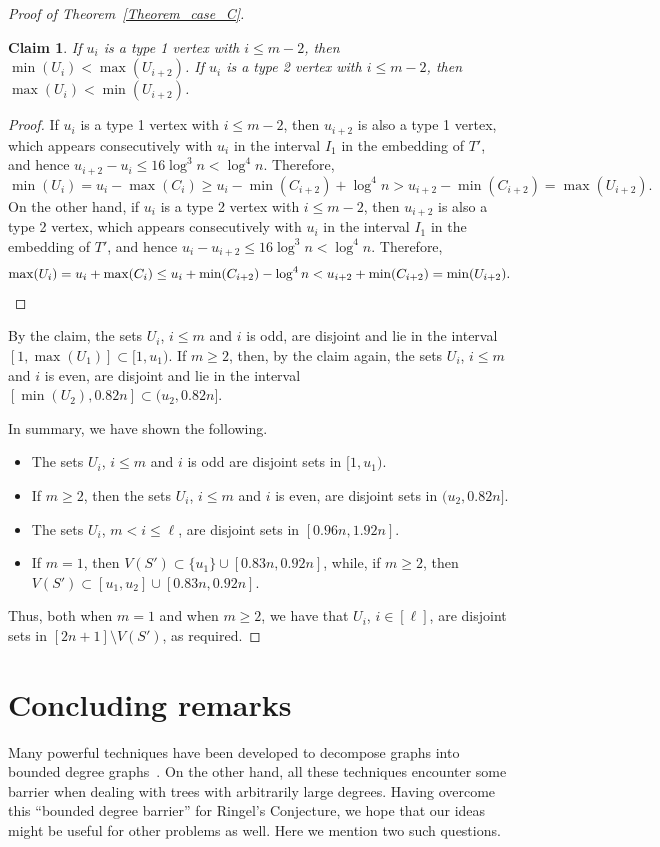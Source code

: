 \documentclass{article}
\newtheorem{claim}[lemma]{Claim}
\theoremstyle{definition}
\begin{document}
\begin{proof}[Proof of Theorem~\ref{Theorem_case_C}]
\begin{claim}
If $u_{i}$ is a type 1 vertex with $i\leq m-2$, then $\min(U_i)< \max (U_{i+2})$.
If $u_{i}$ is a type 2 vertex with $i\leq m-2$, then $\max(U_i) < \min (U_{i+2})$.
\end{claim}
\begin{proof}
If $u_i$ is a type 1 vertex with $i\leq m-2$, then $u_{i+2}$ is also a type 1 vertex, which appears consecutively with $u_i$ in the interval $I_1$ in the embedding of $T'$, and hence $u_{i+2}-u_i\leq 16 \log^3 n<\log^4 n$. Therefore,
\[
\min(U_i)=u_{i}-\max (C_i)\geq u_i-\min(C_{i+2})+\log^4 n > u_{i+2}-\min(C_{i+2})=\max(U_{i+2}).
\]
On the other hand, if $u_i$ is a type 2 vertex with $i\leq m-2$, then $u_{i+2}$ is also a type 2 vertex, which appears consecutively with $u_i$ in the interval $I_1$ in the embedding of $T'$, and hence $u_{i}-u_{i+2}\leq 16 \log^3 n <\log^4 n$. Therefore,
\[
\max(U_i)=u_{i}+\max (C_i)\leq u_i+\min(C_{i+2})-\log^4 n < u_{i+2}+\min(C_{i+2})=\min(U_{i+2}).\qedhere
\]
\end{proof}

By the claim, the sets $U_i$, $i\leq m$ and $i$ is odd, are disjoint and lie in the interval $[1,\max(U_1)]\subset [1,u_1)$. If $m\geq 2$, then, by the claim again, the sets $U_i$, $i\leq m$ and $i$ is even, are disjoint and lie in the interval $[\min(U_2),0.82n]\subset (u_2,0.82n]$.

In summary, we have shown the following.
\begin{itemize}
\item The sets $U_i$, $i\leq m$ and $i$ is odd are disjoint sets in $[1,u_1)$.
\item If $m\geq 2 $, then the sets $U_i$, $i\leq m$ and $i$ is even, are disjoint sets in $(u_2,0.82n]$.
\item The sets $U_i$, $m<i\leq \ell$, are disjoint sets in $[0.96n,1.92n]$.
\item If $m=1$, then $V(S')\subset \{u_1\}\cup [0.83n,0.92n]$, while, if $m\geq 2$, then $V(S')\subset [u_1,u_2]\cup [0.83n,0.92n]$.
\end{itemize}
Thus, both when $m=1$ and when $m\geq 2$, we have that $U_i$, $i\in [\ell]$, are disjoint sets in $[2n+1]\setminus V(S')$, as required.
\end{proof}



\section{Concluding remarks}\label{sec:conc}
Many powerful techniques have been developed to decompose graphs into bounded degree graphs~\cite{bottcher2016approximate, messuti2016packing, ferber2017packing, kim2016blow,joos2016optimal}.
On the other hand, all these techniques encounter some barrier when dealing with trees with arbitrarily large degrees.
Having overcome this ``bounded degree barrier'' for Ringel's Conjecture, we hope that our ideas might be useful for other problems as well. Here we mention two such questions.
\end{document}
